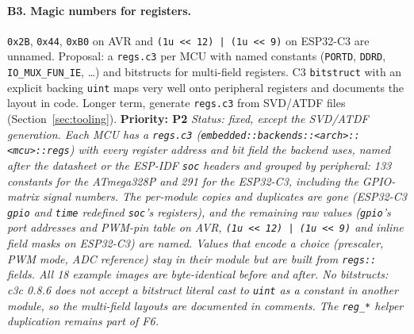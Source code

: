 \documentclass[11pt,a4paper]{article}
\newcommand{\pkg}[1]{\texttt{#1}}
\newcommand{\prio}[1]{\textbf{Priority: #1}}
\begin{document}
\paragraph{B3. Magic numbers for registers.}
\pkg{0x2B}, \pkg{0x44}, \pkg{0xB0} on AVR and \pkg{(1u << 12) | (1u << 9)} on ESP32-C3 are
unnamed. Proposal: a \pkg{regs.c3} per MCU with named constants (\pkg{PORTD}, \pkg{DDRD},
\pkg{IO\_MUX\_FUN\_IE}, \ldots) and bitstructs for multi-field registers. C3 \pkg{bitstruct}
with an explicit backing \pkg{uint} maps very well onto peripheral registers and documents the
layout in code. Longer term, generate \pkg{regs.c3} from SVD/ATDF files
(Section~\ref{sec:tooling}). \prio{P2}
\textit{Status: fixed, except the SVD/ATDF generation. Each MCU has a \pkg{regs.c3} (\pkg{embedded::backends::<arch>::<mcu>::regs}) with every register address and bit field the backend uses, named after the datasheet or the ESP-IDF \pkg{soc} headers and grouped by peripheral: 133 constants for the ATmega328P and 291 for the ESP32-C3, including the GPIO-matrix signal numbers. The per-module copies and duplicates are gone (ESP32-C3 \pkg{gpio} and \pkg{time} redefined \pkg{soc}'s registers), and the remaining raw values (\pkg{gpio}'s port addresses and PWM-pin table on AVR, \pkg{(1u << 12) | (1u << 9)} and inline field masks on ESP32-C3) are named. Values that encode a choice (prescaler, PWM mode, ADC reference) stay in their module but are built from \pkg{regs::} fields. All 18 example images are byte-identical before and after. No bitstructs: c3c 0.8.6 does not accept a bitstruct literal cast to \pkg{uint} as a constant in another module, so the multi-field layouts are documented in comments. The \pkg{reg\_*} helper duplication remains part of F6.}
\end{document}
